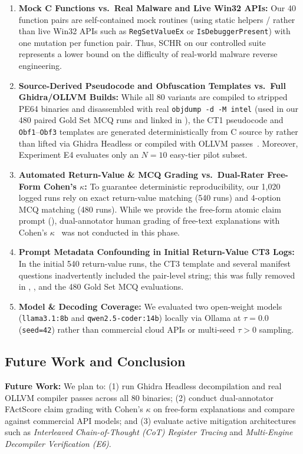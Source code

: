 \documentclass[conference]{IEEEtran}
\begin{document}
\begin{enumerate}
    \item \textbf{Mock C Functions vs.\ Real Malware and Live Win32 APIs:} Our 40 function pairs are self-contained mock routines (using static helpers / rather than live Win32 APIs such as \texttt{RegSetValueEx} or \texttt{IsDebuggerPresent}) with one mutation per function pair. Thus, SCHR on our controlled suite represents a lower bound on the difficulty of real-world malware reverse engineering.
    \item \textbf{Source-Derived Pseudocode and Obfuscation Templates vs.\ Full Ghidra/OLLVM Builds:} While all 80 variants are compiled to stripped PE64 binaries and disassembled with real \texttt{objdump -d -M intel} (used in our 480 paired Gold Set MCQ runs and linked in ), the CT1 pseudocode and \texttt{Obf1}--\texttt{Obf3} templates are generated deterministically from C source by  rather than lifted via Ghidra Headless or compiled with OLLVM passes~\cite{junod2015ollvm}. Moreover, Experiment E4 evaluates only an $N=10$ easy-tier pilot subset.
    \item \textbf{Automated Return-Value \& MCQ Grading vs.\ Dual-Rater Free-Form Cohen's $\kappa$:} To guarantee deterministic reproducibility, our 1,020 logged runs rely on exact return-value matching (540 runs) and 4-option MCQ matching (480 runs). While we provide the free-form atomic claim prompt (), dual-annotator human grading of free-text explanations with Cohen's $\kappa$~\cite{cohen1960coefficient} was not conducted in this phase.
    \item \textbf{Prompt Metadata Confounding in Initial Return-Value CT3 Logs:} In the initial 540 return-value runs, the CT3 template and several manifest questions inadvertently included the pair-level  string; this was fully removed in , , and the 480 Gold Set MCQ evaluations.
    \item \textbf{Model \& Decoding Coverage:} We evaluated two open-weight models (\texttt{llama3.1:8b} and \texttt{qwen2.5-coder:14b}) locally via Ollama at $\tau = 0.0$ (\texttt{seed=42}) rather than commercial cloud APIs or multi-seed $\tau > 0$ sampling.
\end{enumerate}

\subsection{Future Work and Conclusion}
\textbf{Future Work:} We plan to: (1) run Ghidra Headless decompilation and real OLLVM compiler passes across all 80 binaries; (2) conduct dual-annotator FActScore claim grading with Cohen's $\kappa$ on free-form explanations and compare against commercial API models; and (3) evaluate active mitigation architectures such as \textit{Interleaved Chain-of-Thought (CoT) Register Tracing} and \textit{Multi-Engine Decompiler Verification (E6)}.
\end{document}
